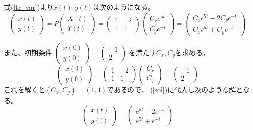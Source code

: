 \documentclass[12pt,b5paper]{ltjsarticle}
\begin{document}
\begin{enumerate}
      式(\ref{tr_var})より$x(t),y(t)$は次のようになる。
      \begin{equation}
       \begin{pmatrix} x(t)\\y(t) \end{pmatrix}=P\begin{pmatrix} X(t)\\Y(t) \end{pmatrix}
       =\begin{pmatrix} 1 & -2 \\ 1 & 1 \end{pmatrix}\begin{pmatrix} C_xe^{5t} \\ C_ye^{-t} \end{pmatrix}
       = \begin{pmatrix} C_xe^{5t} -2C_ye^{-t} \\ C_xe^{5t} + C_ye^{-t} \end{pmatrix}
       \label{sol}
      \end{equation}

      また、初期条件
      $\begin{pmatrix} x(0)\\y(0) \end{pmatrix}=
      \begin{pmatrix} -1\\2 \end{pmatrix}$
      を満たす$C_x,C_y$を求める。
      \begin{equation}
       \begin{pmatrix} x(0)\\y(0) \end{pmatrix}
       =\begin{pmatrix} 1 & -2 \\ 1 & 1 \end{pmatrix}\begin{pmatrix} C_x \\ C_y \end{pmatrix}
       =\begin{pmatrix} -1 \\ 2 \end{pmatrix}
      \end{equation}
      これを解くと$(C_x,C_y)=(1,1)$であるので、
      (\ref{sol})に代入し次のような解となる。
      \begin{equation}
       \begin{pmatrix} x(t)\\y(t) \end{pmatrix}
        = \begin{pmatrix} e^{5t} -2e^{-t} \\ e^{5t} + e^{-t} \end{pmatrix}
      \end{equation}


\end{enumerate}
\end{document}
